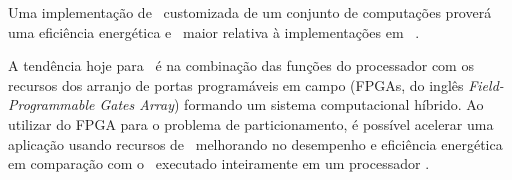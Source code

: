 



      Uma implementação de \hardware\ customizada de um conjunto de computações proverá uma eficiência energética e \speedup\ maior relativa à implementações em \software\ \cite{Zhang2008, Hassine2017, Wolf1994, Canis2011, Stone2010}.

      A tendência hoje para \design\ é na combinação das funções do processador com os recursos dos arranjo de portas programáveis em campo (FPGAs, do inglês \textit{Field-Programmable Gates Array}) formando um sistema computacional híbrido. %
   	Ao utilizar do FPGA para o problema de particionamento, é possível acelerar uma aplicação usando recursos de \hardware\ melhorando no desempenho e eficiência energética em comparação com o \software\ executado inteiramente em um processador \cite{Cong2009, Lo2009, Zhang2008a}.



